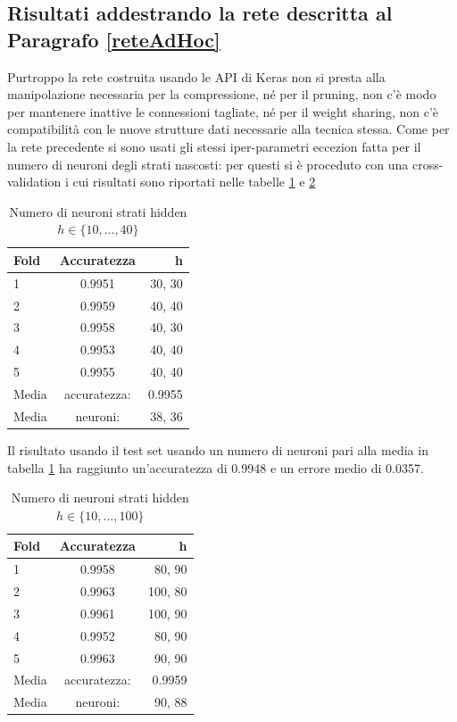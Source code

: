 \documentclass[12pt]{report}
\begin{document}
\newpage

\subsection{Risultati addestrando la rete descritta al Paragrafo \ref{reteAdHoc}}
Purtroppo la rete costruita usando le API di Keras non si presta alla manipolazione necessaria per la compressione, né per il pruning, non c’è modo per mantenere inattive le connessioni tagliate, né per il weight sharing, non c’è compatibilità con le nuove strutture dati necessarie alla tecnica stessa.
Come per la rete precedente si sono usati gli stessi iper-parametri eccezion fatta per il numero di neuroni degli strati nascosti: per questi si è proceduto con una cross-validation i cui risultati sono riportati nelle tabelle \ref{hoc2_10_40} e \ref{hoc2_10_100}
\par\null\par
\begin{table}[H]
\begin{center}
\begin{tabular}{lcr}
\toprule
Fold & Accuratezza & h \\
\midrule
1 & 0.9951 & 30, 30\\
2 & 0.9959 & 40, 40\\
3 & 0.9958 & 40, 30\\
4 & 0.9953 & 40, 40\\
5 & 0.9955 & 40, 40\\
\bottomrule
Media & accuratezza: & 0.9955\\
Media & neuroni: & 38, 36
\end{tabular}
\end{center}
\caption{Numero di neuroni strati hidden $h \in \{10, \dots, 40 \}$}
\label{hoc2_10_40}
\end{table}

Il risultato usando il test set usando un numero di neuroni pari alla media in tabella \ref{hoc2_10_40} ha raggiunto un'accuratezza di 0.9948 e un errore medio di 0.0357.

\null\par\null

\begin{table}[H]
\begin{center}
\begin{tabular}{lcr}
\toprule
Fold & Accuratezza & h \\
\midrule
1 & 0.9958 & 80, 90\\
2 & 0.9963 & 100, 80\\
3 & 0.9961 & 100, 90\\
4 & 0.9952 & 80, 90\\
5 & 0.9963 & 90, 90\\
\bottomrule
Media & accuratezza: & 0.9959\\
Media & neuroni: & 90, 88
\end{tabular}
\end{center}
\caption{Numero di neuroni strati hidden $h \in \{10, \dots, 100 \}$}
\label{hoc2_10_100}
\end{table}
\end{document}
